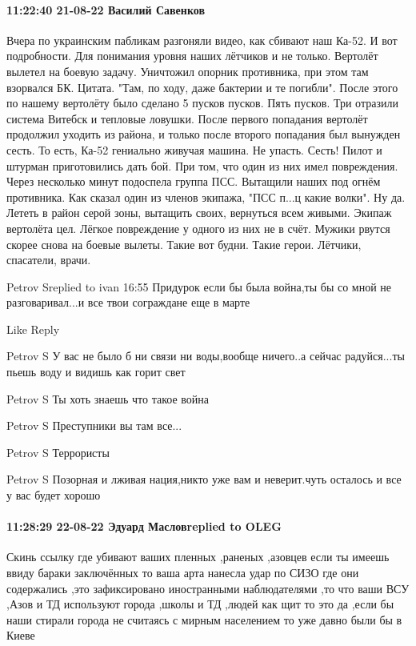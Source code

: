 \paragraph{11:22:40 21-08-22 Василий Савенков}

Вчера по украинским пабликам разгоняли видео, как сбивают наш Ка-52.
И вот подробности. Для понимания уровня наших лётчиков и не только.
Вертолёт вылетел на боевую задачу. Уничтожил опорник противника, при этом там взорвался БК. Цитата. "Там, по ходу, даже бактерии и те погибли".
После этого по нашему вертолёту было сделано 5 пусков пусков. Пять пусков. Три отразили система Витебск и тепловые ловушки. После первого попадания вертолёт продолжил уходить из района, и только после второго попадания был вынужден сесть. То есть, Ка-52 гениально живучая машина.
Не упасть. Сесть! Пилот и штурман приготовились дать бой. При том, что один из них имел повреждения.
Через несколько минут
подоспела группа ПСС. Вытащили наших под огнём противника. Как сказал один из членов экипажа, "ПСС п...ц какие волки". Ну да. Лететь в район серой зоны, вытащить своих, вернуться всем живыми.
Экипаж вертолёта цел. Лёгкое повреждение у одного из них не в счёт. Мужики рвутся скорее снова на боевые вылеты.
Такие вот будни. Такие герои. Лётчики, спасатели, врачи.

Petrov Sreplied to ivan
16:55
Придурок если бы была война,ты бы со мной не разговаривал...и все твои сограждане еще в марте

    Like
    Reply

Petrov S
У вас не было б ни связи ни воды,вообще ничего..а сейчас радуйся...ты пьешь воду и видишь как горит свет

Petrov S
Ты хоть знаешь что такое война

Petrov S
Преступники вы там все...

Petrov S
Террористы

Petrov S
Позорная и лживая нация,никто уже вам и неверит.чуть осталось и все у вас будет хорошо

\paragraph{11:28:29 22-08-22 Эдуард Масловreplied to OLEG}

Скинь ссылку где убивают ваших пленных ,раненых ,азовцев если ты имеешь ввиду
бараки заключённых то ваша арта нанесла удар по СИЗО где они содержались ,это
зафиксировано иностранными наблюдателями ,то что ваши ВСУ ,Азов и ТД используют
города ,школы и ТД ,людей как щит то это да ,если бы наши стирали города не
считаясь с мирным населением то уже давно были бы в Киеве

